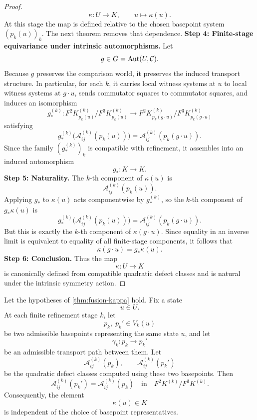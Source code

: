 \begin{proof}
	\[
		\kappa:U\to K,
		\qquad
		u\mapsto \kappa(u).
	\]
	At this stage the map is defined relative to the chosen basepoint system
	\((p_k(u))_k\). The next theorem removes that dependence.
	\medskip
	\noindent
	\textbf{Step 4: Finite-stage equivariance under intrinsic automorphisms.}
	Let
	\[
		g\in G=\operatorname{Aut}(U,\mathcal C).
	\]
	Because \(g\) preserves the comparison world, it preserves the induced
	transport structure. In particular, for each \(k\), it carries local
	witness systems at \(u\) to local witness systems at \(g\cdot u\), sends
	commutator squares to commutator squares, and induces an isomorphism
	\[
		g_*^{(k)}:
		F^2K_{p_k(u)}^{(k)}/F^3K_{p_k(u)}^{(k)}
		\to
		F^2K_{p_k(g\cdot u)}^{(k)}/F^3K_{p_k(g\cdot u)}^{(k)}
	\]
	satisfying
	\[
		g_*^{(k)}
		\bigl(\mathcal A_{ij}^{(k)}(p_k(u))\bigr)
		=
		\mathcal A_{ij}^{(k)}(p_k(g\cdot u)).
	\]
	Since the family \((g_*^{(k)})_k\) is compatible with refinement, it
	assembles into an induced automorphism
	\[
		g_*:K\to K.
	\]
	\medskip
	\noindent
	\textbf{Step 5: Naturality.}
	The \(k\)-th component of \(\kappa(u)\) is
	\[
		\mathcal A_{ij}^{(k)}(p_k(u)).
	\]
	Applying \(g_*\) to \(\kappa(u)\) acts componentwise by \(g_*^{(k)}\), so
	the \(k\)-th component of \(g_*\kappa(u)\) is
	\[
		g_*^{(k)}
		\bigl(\mathcal A_{ij}^{(k)}(p_k(u))\bigr)
		=
		\mathcal A_{ij}^{(k)}(p_k(g\cdot u)).
	\]
	But this is exactly the \(k\)-th component of \(\kappa(g\cdot u)\).
	Since equality in an inverse limit is equivalent to equality of all
	finite-stage components, it follows that
	\[
		\kappa(g\cdot u)=g_*\kappa(u).
	\]
	\medskip
	\noindent
	\textbf{Step 6: Conclusion.}
	Thus the map
	\[
		\kappa:U\to K
	\]
	is canonically defined from compatible quadratic defect classes and is
	natural under the intrinsic symmetry action.
\end{proof}
\begin{theorem}
	Let the hypotheses of \cref{thm:fusion-kappa} hold.
	Fix a state
	\[
		u\in U.
	\]
	At each finite refinement stage \(k\), let
	\[
		p_k,\;p_k'\in V_k(u)
	\]
	be two admissible basepoints representing the same state \(u\), and let
	\[
		\gamma_k:p_k\to p_k'
	\]
	be an admissible transport path between them.
	Let
	\[
		\mathcal A_{ij}^{(k)}(p_k),
		\qquad
		\mathcal A_{ij}^{(k)}(p_k')
	\]
	be the quadratic defect classes computed using these two basepoints.
	Then
	\[
		\mathcal A_{ij}^{(k)}(p_k')
		=
		\mathcal A_{ij}^{(k)}(p_k)
		\quad\text{in}\quad
		F^2K^{(k)}/F^3K^{(k)}.
	\]
	Consequently, the element
	\[
		\kappa(u)\in K
	\]
	is independent of the choice of basepoint representatives.
\end{theorem}
